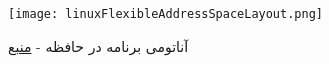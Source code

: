\begin{figure}[h]
	\centering
	\texttt{[image: linuxFlexibleAddressSpaceLayout.png]}
	\caption{آناتومی برنامه در حافظه - \href{https://manybutfinite.com/post/anatomy-of-a-program-in-memory/}{منبع}}
\end{figure}